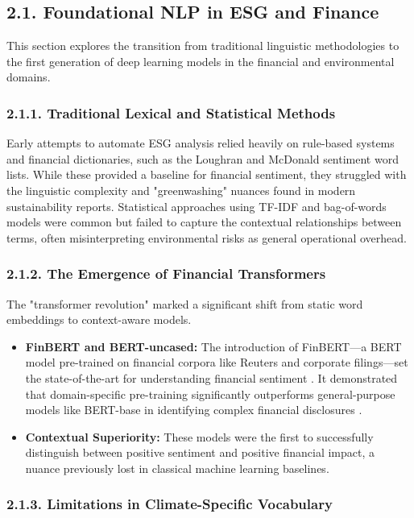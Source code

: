 \documentclass{article}
\begin{document}
\subsection*{2.1. Foundational NLP in ESG and Finance}

This section explores the transition from traditional linguistic methodologies to the first generation of deep learning models in the financial and environmental domains.
\subsubsection*{2.1.1. Traditional Lexical and Statistical Methods}

Early attempts to automate ESG analysis relied heavily on rule-based systems and financial dictionaries, such as the Loughran and McDonald sentiment word lists. While these provided a baseline for financial sentiment, they struggled with the linguistic complexity and "greenwashing" nuances found in modern sustainability reports. Statistical approaches using TF-IDF and bag-of-words models were common but failed to capture the contextual relationships between terms, often misinterpreting environmental risks as general operational overhead.
\subsubsection*{2.1.2. The Emergence of Financial Transformers}

The "transformer revolution" marked a significant shift from static word embeddings to context-aware models.
\begin{itemize}
\item 

\textbf{FinBERT and BERT-uncased:} The introduction of FinBERT—a BERT model pre-trained on financial corpora like Reuters and corporate filings—set the state-of-the-art for understanding financial sentiment  \parencite{eduardo_c__garrido_merch_n_5c6b0bfa}. It demonstrated that domain-specific pre-training significantly outperforms general-purpose models like BERT-base in identifying complex financial disclosures  \parencite{eduardo_c__garrido_merch_n_5c6b0bfa}.\item 

\textbf{Contextual Superiority:} These models were the first to successfully distinguish between positive sentiment and positive financial impact, a nuance previously lost in classical machine learning baselines.
\end{itemize}
\subsubsection*{2.1.3. Limitations in Climate-Specific Vocabulary}
\end{document}
